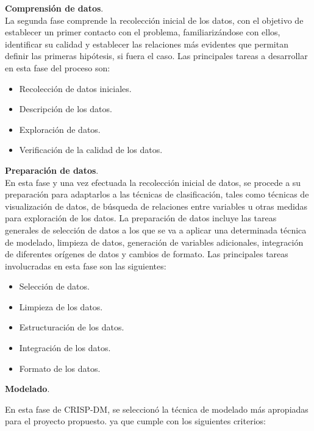\noindent
\textbf{Comprensión de datos}.\\

	La segunda fase comprende la recolección inicial de los  datos, con el objetivo de establecer un primer contacto con el problema, familiarizándose con ellos, identificar su calidad y establecer las relaciones más evidentes que permitan definir las primeras hipótesis, si fuera el caso. Las principales tareas a desarrollar en esta fase del proceso son:\\

\begin{itemize}
\item Recolección de datos iniciales.
\item Descripción de los datos.
\item Exploración de datos.
\item Verificación de la calidad de los datos.\\
\end{itemize}

\noindent
\textbf{Preparación de datos}.\\

En esta fase y una vez efectuada la recolección inicial de datos, se procede a su preparación para adaptarlos a las técnicas de clasificación, tales como técnicas de visualización de datos, de búsqueda de relaciones entre variables u otras medidas para exploración de los datos. La preparación de datos incluye las tareas generales de selección de datos a los que se va a aplicar una determinada técnica de modelado, limpieza de datos, generación de variables adicionales, integración de diferentes orígenes de datos y cambios de formato. Las principales tareas involucradas en esta fase son las siguientes:\\

\begin{itemize}
\item	Selección de datos.
\item Limpieza de los datos.
\item	Estructuración de los datos.
\item	Integración de los datos.
\item	Formato de los datos.\\
\end{itemize}

\noindent
\textbf{Modelado}.

En esta fase de CRISP-DM, se seleccionó la técnica de modelado más apropiadas para el proyecto propuesto. ya que cumple con los siguientes criterios:

